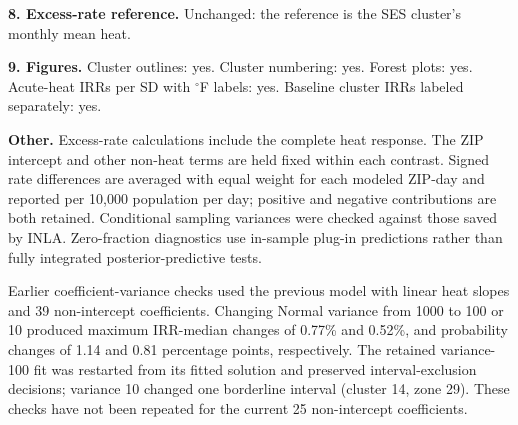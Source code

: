 \documentclass[10pt]{article}
\begin{document}
\textbf{8. Excess-rate reference.}
Unchanged: the reference is the SES cluster's monthly mean heat.

\textbf{9. Figures.}
Cluster outlines: yes. Cluster numbering: yes. Forest plots: yes.
Acute-heat IRRs per SD with $^{\circ}$F labels: yes.
Baseline cluster IRRs labeled separately: yes.

\textbf{Other.}
Excess-rate calculations include the complete heat response. The ZIP
intercept and other non-heat terms are held fixed within each contrast.
Signed rate differences are averaged with equal weight for each modeled
ZIP-day and reported per 10,000 population per day; positive and negative
contributions are both retained. Conditional sampling variances were
checked against those saved by INLA. Zero-fraction diagnostics use
in-sample plug-in predictions rather than fully integrated
posterior-predictive tests.

Earlier coefficient-variance checks used the previous model with linear heat
slopes and 39 non-intercept coefficients. Changing Normal variance from 1000 to
100 or 10 produced maximum IRR-median changes of 0.77\% and 0.52\%, and probability
changes of 1.14 and 0.81 percentage points, respectively. The retained variance-100
fit was restarted from its fitted solution and preserved interval-exclusion
decisions; variance 10 changed one borderline interval (cluster 14, zone 29).
These checks have not been repeated for the current 25 non-intercept coefficients.
\end{document}
